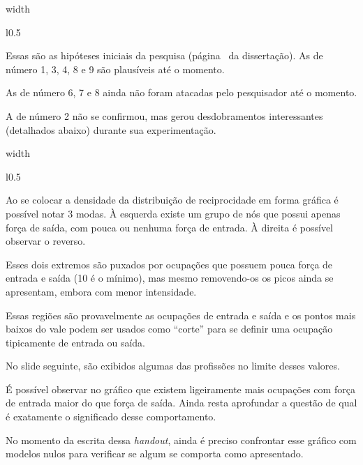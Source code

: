 \documentclass[10pt,a4paper,final]{article}
\newcommand\disappearingrule{%
  \par %
  \vskip10pt %
  \leaders\vrule width \textwidth\vskip0.4pt %
  \nointerlineskip %
  \vskip10pt %
}
\begin{document}
\disappearingrule

\begin{minipage}[t][18\baselineskip]{\linewidth}
  \begin{wrapfigure}{l}{0.5\textwidth}
  \end{wrapfigure}
  
  Essas são as hipóteses iniciais da pesquisa (página~\pageref{sec:resultados-preliminares} da dissertação). As de número 1, 3, 4, 8 e 9 são plausíveis até o momento.
  
  As de número 6, 7 e 8 ainda não foram atacadas pelo pesquisador até o momento.
  
  A de número 2 não se confirmou, mas gerou desdobramentos interessantes (detalhados abaixo) durante sua experimentação.
\end{minipage}

\disappearingrule

\begin{minipage}[t]{\linewidth}
  \begin{wrapfigure}{l}{0.5\textwidth}
  \end{wrapfigure}
  
  Ao se colocar a densidade da distribuição de reciprocidade em forma gráfica é possível notar 3 modas. À esquerda existe um grupo de nós que possui apenas força de saída, com pouca ou nenhuma força de entrada. À direita é possível observar o reverso.
  
  Esses dois extremos são puxados por ocupações que possuem pouca força de entrada e saída (10 é o mínimo), mas mesmo removendo-os os picos ainda se apresentam, embora com menor intensidade.
  
  Essas regiões são provavelmente as ocupações de entrada e saída e os pontos mais baixos do vale podem ser usados como \enquote{corte} para se definir uma ocupação tipicamente de entrada ou saída.
  
  No slide seguinte, são exibidos algumas das profissões no limite desses valores.
  
  É possível observar no gráfico que existem ligeiramente mais ocupações com força de entrada maior do que força de saída. Ainda resta aprofundar a questão de qual é exatamente o significado desse comportamento.
  
  No momento da escrita dessa \textit{handout}, ainda é preciso confrontar esse gráfico com modelos nulos para verificar se algum se comporta como apresentado.
\end{minipage}
\end{document}
